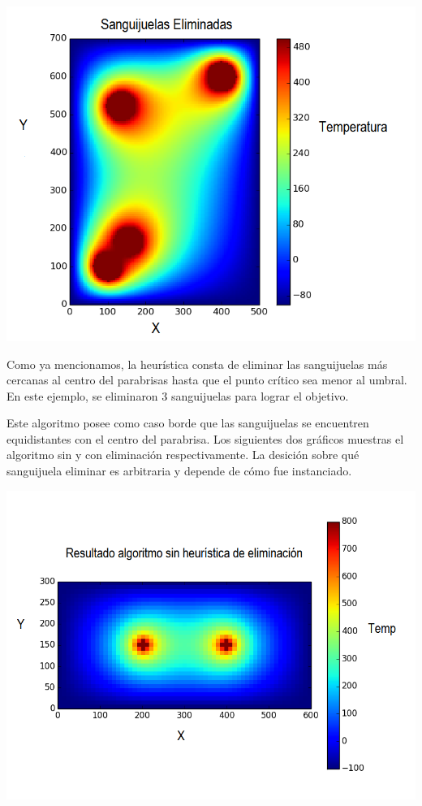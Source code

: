 	\begin{center}
		\includegraphics[width=\textwidth]{./img/test5_conkill.png}
	\end{center}

	Como ya mencionamos, la heurística consta de eliminar las sanguijuelas más cercanas al centro del parabrisas hasta que el punto crítico sea menor al umbral. En este ejemplo, se eliminaron 3 sanguijuelas para lograr el objetivo.

	Este algoritmo posee como caso borde que las sanguijuelas se encuentren equidistantes con el centro del parabrisa. Los siguientes dos gráficos muestras el algoritmo sin y con eliminación respectivamente. La desición sobre qué sanguijuela eliminar es arbitraria y depende de cómo fue instanciado.

	\begin{center}
		\includegraphics[width=\textwidth]{./img/test6_sinkill.png}
	\end{center}


